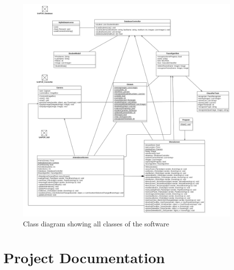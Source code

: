\documentclass[12pt, a4paper]{article}
\begin{document}
\begin{figure}[H]
		\includegraphics[width=1.2\columnwidth]{images/class_diagram}
	\caption{Class diagram showing all classes of the software}
	\label{fig:folder}
\end{figure}



\newpage



\section{Project Documentation}
\end{document}
